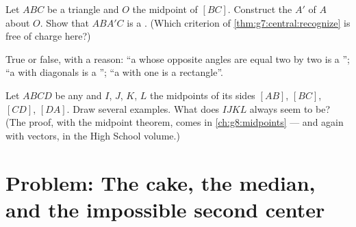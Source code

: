 \begin{exercise}[$\star\star$]\label{exo:g7:central:9}
Let $ABC$ be a triangle and $O$ the midpoint of $[BC]$. Construct the
 $A'$ of $A$ about $O$. Show that $ABA'C$ is a
. (Which criterion of \cref{thm:g7:central:recognize} is
free of charge here?)
\end{exercise}

\begin{exercise}[$\star\star$]\label{exo:g7:central:10}
True or false, with a reason: ``a  whose opposite angles
are equal two by two is a ''; ``a  with
 diagonals is a ''; ``a  with one
 is a rectangle''.
\end{exercise}

\begin{exercise}[$\star\star\star$]\label{exo:g7:central:11}
Let $ABCD$ be any  and $I$, $J$, $K$, $L$ the midpoints
of its sides $[AB]$, $[BC]$, $[CD]$, $[DA]$. Draw several examples.
What does $IJKL$ always seem to be? (The proof, with the midpoint
theorem, comes in \cref{ch:g8:midpoints} --- and again with vectors,
in the High School volume.)
\end{exercise}

\section{Problem: The cake, the median, and the impossible second
center}

